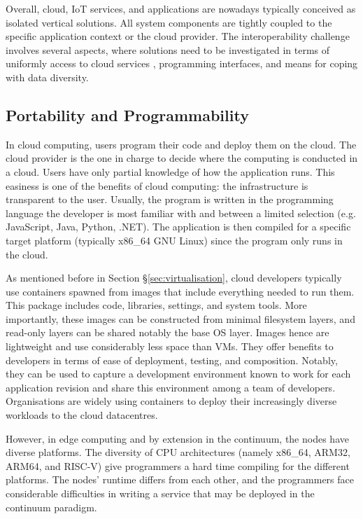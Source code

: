 Overall, cloud, IoT services, and applications are nowadays typically conceived as isolated vertical solutions. All system components are tightly coupled to the specific application context or the cloud provider. The interoperability challenge involves several aspects, where solutions need to be investigated in terms of uniformly access to cloud services \cite{grozev2014inter}, programming interfaces, and means for coping with data diversity.

\subsection{Portability and Programmability}

In cloud computing, users program their code and deploy them on the cloud. The cloud provider is the one in charge to decide where the computing is conducted in a cloud. Users have only partial knowledge of how the application runs. This easiness is one of the benefits of cloud computing: the infrastructure is transparent to the user. Usually, the program is written in the programming language the developer is most familiar with and between a limited selection (e.g. JavaScript, Java, Python, .NET). The application is then compiled for a specific target platform (typically x86\_64 GNU Linux) since the program only runs in the cloud.

As mentioned before in Section §\ref{sec:virtualisation}, cloud developers typically use containers spawned from images that include everything needed to run them. This package includes code, libraries, settings, and system tools. More importantly, these images can be constructed from minimal filesystem layers, and read-only layers can be shared notably the base OS layer. Images hence are lightweight and use considerably less space than VMs. They offer benefits to developers in terms of ease of deployment, testing, and composition. Notably, they can be used to capture a development environment known to work for each application revision and share this environment among a team of developers. Organisations are widely using containers to deploy their increasingly diverse workloads to the cloud datacentres.

However, in edge computing and by extension in the continuum, the nodes have diverse platforms. The diversity of CPU architectures (namely x86\_64, ARM32, ARM64, and RISC-V) give programmers a hard time compiling for the different platforms. The nodes' runtime differs from each other, and the programmers face considerable difficulties in writing a service that may be deployed in the continuum paradigm.

